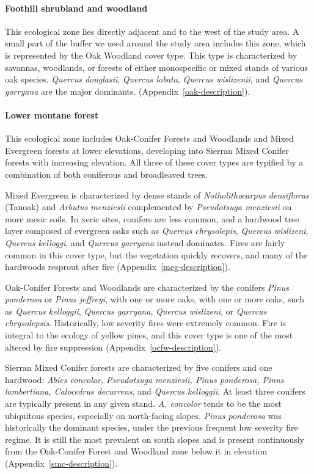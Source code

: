 \paragraph{Foothill shrubland and woodland} This ecological zone lies directly adjacent and to the west of the study area. A small part of the buffer we used around the study area includes this zone, which is represented by the Oak Woodland cover type. This type is characterized by savannas, woodlands, or forests of either monospecific or mixed stands of various oak species. \emph{Quercus douglasii}, \emph{Quercus lobata}, \emph{Quercus wislizenii}, and \emph{Quercus garryana} are the major dominants. (Appendix~\ref{oak-description}).

\paragraph{Lower montane forest} This ecological zone includes Oak-Conifer Forests and Woodlands and Mixed Evergreen forests at lower elevations, developing into Sierran Mixed Conifer forests with increasing elevation. All three of these cover types are typified by a combination of both coniferous and broadleaved trees. 

Mixed Evergreen is characterized by dense stands of \emph{Notholithocarpus densiflorus} (Tanoak) and \emph{Arbutus menziesii} complemented by \emph{Pseudotsuga menziesii} on more mesic soils. In xeric sites, conifers are less common, and a hardwood tree layer composed of evergreen oaks such as \emph{Quercus chrysolepis}, \emph{Quercus wislizeni}, \emph{Quercus kelloggi}, and \emph{Quercus garryana} instead dominates. Fires are fairly common in this cover type, but the vegetation quickly recovers, and many of the hardwoods resprout after fire (Appendix~\ref{meg-description}). 

Oak-Conifer Forests and Woodlands are characterized by the conifers \emph{Pinus ponderosa} or \emph{Pinus jeffreyi}, with one or more oaks, with one or more oaks, such as \emph{Quercus kelloggii}, \emph{Quercus garryana}, \emph{Quercus wislizeni}, or \emph{Quercus chrysolepsis}. Historically, low severity fires were extremely common. Fire is integral to the ecology of yellow pines, and this cover type is one of the most altered by fire suppression (Appendix~\ref{ocfw-description}).

Sierran Mixed Conifer forests are characterized by five conifers and one hardwood: \emph{Abies concolor, Pseudotsuga menziesii, Pinus ponderosa, Pinus lambertiana, Calocedrus decurrens}, and \emph{Quercus kelloggii}. At least three conifers are typically present in any given stand. \emph{A. concolor} tends to be the most ubiquitous species, especially on north-facing slopes. \emph{Pinus ponderosa} was historically the dominant species, under the previous frequent low severity fire regime. It is still the most prevalent on south slopes and is present continuously from the Oak-Conifer Forest and Woodland zone below it in elevation (Appendix~\ref{smc-description}).


